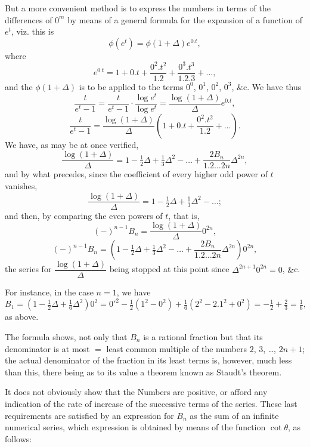 \documentclass[11pt,a4paper]{book}
\begin{document}
But a more convenient method is to express the numbers in terms of the
differences of $0^m$ by means of a general formula for the expansion of a
function of $e^t$, viz. this is
\[
\phi(e^t) = \phi(1+\Delta)e^{0.t},
\]
where
\[
e^{0.t} = 1 + 0.t + \frac{0^2.t^2}{1.2} + \frac{0^3.t^3}{1.2.3} + \ldots,
\]
and the $\phi(1+\Delta)$ is to be applied to the terms $0^0$, $0^1$, $0^2$,
$0^3$, $\&$c. We have thus
\[
\frac{t}{e^t-1}
= \frac{t}{e^t-1}\cdot\frac{\log e^t}{\log e^t}
= \frac{\log(1+\Delta)}{\Delta}e^{0.t},
\]
\[
\frac{t}{e^t-1}
= \frac{\log(1+\Delta)}{\Delta}
  \left(1 + 0.t + \frac{0^2.t^2}{1.2} + \ldots\right).
\]
We have, as may be at once verified,
\[
\frac{\log(1+\Delta)}{\Delta}
= 1 - \tfrac{1}{2}\Delta + \tfrac{1}{3}\Delta^2 - \ldots
  + \frac{2B_n}{1.2\ldots 2n}\Delta^{2n},
\]
and by what precedes, since the coefficient of every higher odd power of $t$
vanishes,
\[
\frac{\log(1+\Delta)}{\Delta}
= 1 - \tfrac{1}{2}\Delta + \tfrac{1}{3}\Delta^2 - \ldots;
\]
and then, by comparing the even powers of $t$, that is,
\[
(-)^{n-1}B_n = \frac{\log(1+\Delta)}{\Delta}0^{2n},
\]
\[
(-)^{n-1}B_n
= \left(1 - \tfrac{1}{2}\Delta + \tfrac{1}{3}\Delta^2 - \ldots
  + \frac{2B_n}{1.2\ldots 2n}\Delta^{2n}\right)0^{2n},
\]
the series for $\dfrac{\log(1+\Delta)}{\Delta}$ being stopped at this point since
$\Delta^{2n+1}0^{2n}=0$, $\&$c.

For instance, in the case $n=1$, we have
\[
B_1 = \left(1 - \tfrac{1}{2}\Delta + \tfrac{1}{6}\Delta^2\right)0^2
    = 0'^2 - \tfrac{1}{2}(1^2-0^2) + \tfrac{1}{6}(2^2-2.1^2+0^2)
    = -\tfrac{1}{2} + \tfrac{2}{3} = \tfrac{1}{6},
\]
as above.

\newpage
The formula shows, not only that $B_n$ is a rational fraction but that its
denominator is at most $=$ least common multiple of the numbers $2$, $3$, \ldots,
$2n+1$; the actual denominator of the fraction in its least terms is, however,
much less than this, there being as to its value a theorem known as Staudt's
theorem.

It does not obviously show that the Numbers are positive, or afford any
indication of the rate of increase of the successive terms of the series.
These last requirements are satisfied by an expression for $B_n$ as the sum
of an infinite numerical series, which expression is obtained by means of the
function $\cot\theta$, as follows:
\end{document}
